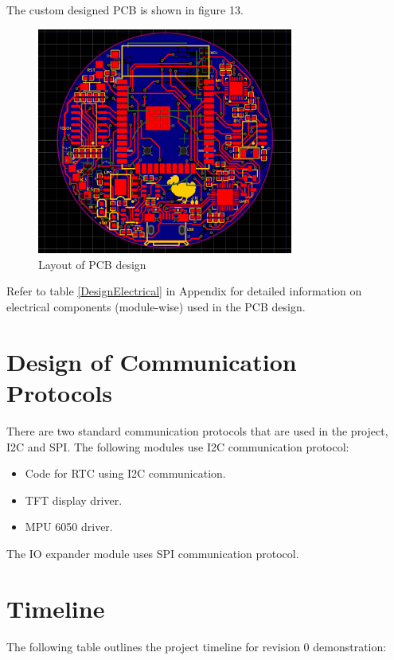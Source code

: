 \documentclass[12pt, titlepage]{article}
\begin{document}
The custom designed PCB is shown in figure 13.

\begin{figure}[H]
	\begin{center}
		 \includegraphics[width=0.75\textwidth]{Layout}
		\caption{Layout of PCB design}
		\label{Layout} 
	\end{center}
\end{figure}

Refer to table \ref{DesignElectrical} in Appendix for detailed information on electrical components (module-wise) used in the PCB design.

\section{Design of Communication Protocols}

There are two standard communication protocols that are used in the project, I2C and SPI. The following modules use I2C communication protocol:
\begin{itemize}
\item Code for RTC using I2C communication.
\item TFT display driver.
\item MPU 6050 driver.
\end{itemize}

The IO expander module uses SPI communication protocol.

\section{Timeline}

The following table outlines the project timeline for revision 0 demonstration:
\end{document}
